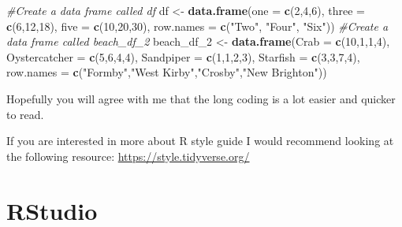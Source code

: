 \documentclass[]{book}
\newenvironment{Shaded}{\begin{snugshade}}{\end{snugshade}}
\newcommand{\KeywordTok}[1]{\textcolor[rgb]{0.13,0.29,0.53}{\textbf{#1}}}
\newcommand{\DataTypeTok}[1]{\textcolor[rgb]{0.13,0.29,0.53}{#1}}
\newcommand{\DecValTok}[1]{\textcolor[rgb]{0.00,0.00,0.81}{#1}}
\newcommand{\StringTok}[1]{\textcolor[rgb]{0.31,0.60,0.02}{#1}}
\newcommand{\CommentTok}[1]{\textcolor[rgb]{0.56,0.35,0.01}{\textit{#1}}}
\newcommand{\NormalTok}[1]{#1}
\begin{document}
\begin{Shaded}
\begin{Highlighting}[]
\CommentTok{#Create a data frame called df}
\NormalTok{df <-}\StringTok{ }\KeywordTok{data.frame}\NormalTok{(}\DataTypeTok{one =} \KeywordTok{c}\NormalTok{(}\DecValTok{2}\NormalTok{,}\DecValTok{4}\NormalTok{,}\DecValTok{6}\NormalTok{), }
                 \DataTypeTok{three =} \KeywordTok{c}\NormalTok{(}\DecValTok{6}\NormalTok{,}\DecValTok{12}\NormalTok{,}\DecValTok{18}\NormalTok{), }
                 \DataTypeTok{five =} \KeywordTok{c}\NormalTok{(}\DecValTok{10}\NormalTok{,}\DecValTok{20}\NormalTok{,}\DecValTok{30}\NormalTok{), }
                 \DataTypeTok{row.names =} \KeywordTok{c}\NormalTok{(}\StringTok{"Two"}\NormalTok{, }\StringTok{"Four"}\NormalTok{, }\StringTok{"Six"}\NormalTok{))}
\CommentTok{#Create a data frame called beach_df_2}
\NormalTok{beach_df_}\DecValTok{2}\NormalTok{ <-}\StringTok{ }\KeywordTok{data.frame}\NormalTok{(}\DataTypeTok{Crab =} \KeywordTok{c}\NormalTok{(}\DecValTok{10}\NormalTok{,}\DecValTok{1}\NormalTok{,}\DecValTok{1}\NormalTok{,}\DecValTok{4}\NormalTok{), }
                         \DataTypeTok{Oystercatcher =} \KeywordTok{c}\NormalTok{(}\DecValTok{5}\NormalTok{,}\DecValTok{6}\NormalTok{,}\DecValTok{4}\NormalTok{,}\DecValTok{4}\NormalTok{),}
                         \DataTypeTok{Sandpiper =} \KeywordTok{c}\NormalTok{(}\DecValTok{1}\NormalTok{,}\DecValTok{1}\NormalTok{,}\DecValTok{2}\NormalTok{,}\DecValTok{3}\NormalTok{),}
                         \DataTypeTok{Starfish =} \KeywordTok{c}\NormalTok{(}\DecValTok{3}\NormalTok{,}\DecValTok{3}\NormalTok{,}\DecValTok{7}\NormalTok{,}\DecValTok{4}\NormalTok{), }
                         \DataTypeTok{row.names =} \KeywordTok{c}\NormalTok{(}\StringTok{"Formby"}\NormalTok{,}\StringTok{"West Kirby"}\NormalTok{,}\StringTok{"Crosby"}\NormalTok{,}\StringTok{"New Brighton"}\NormalTok{))}
\end{Highlighting}
\end{Shaded}

Hopefully you will agree with me that the long coding is a lot easier
and quicker to read.

If you are interested in more about R style guide I would recommend
looking at the following resource: \url{https://style.tidyverse.org/}

\section{RStudio}\label{rstudio}
\end{document}
